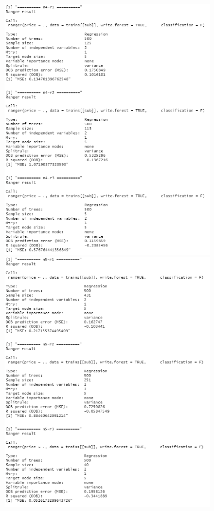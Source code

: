\documentclass{FR16}
\begin{document}
\newpage
\begin{figure}[!htb]
   \begin{minipage}{0.48\textwidth}
     \centering
     \includegraphics[width=1\linewidth]{figures/rgn2.4.png}
   \end{minipage}
   \begin{minipage}{0.48\textwidth}
     \centering
     \includegraphics[width=1\linewidth]{figures/rgn2.5.png}

\end{minipage}
\end{figure}
\end{document}
